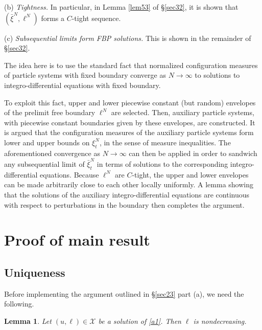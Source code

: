 \documentclass[11pt]{amsart}
\theoremstyle{plain}
\newtheorem{lemma}[theorem]{Lemma}
\newcommand{\beginsec}{
\setcounter{equation}{0}
}
\newcommand{\calX}{{\mathcal X}}
\newcommand{\iy}{\infty}
\begin{document}
(b) {\it Tightness.}
In particular, in Lemma \ref{lem53} of \S\ref{sec32}, it is shown that $(\bar\xi^N,\ell^N)$ forms a $C$-tight sequence.

(c) {\it Subsequential limits form FBP solutions.} This is shown in the remainder of \S\ref{sec32}.

The idea here is to use the standard fact that normalized configuration measures of particle systems with fixed boundary converge as $N\to\iy$ to solutions to integro-differential equations with fixed boundary.

To exploit this fact, upper and lower piecewise constant (but random) envelopes of the prelimit free boundary $\ell^N$ are selected. Then, auxiliary particle systems, with piecewise constant boundaries given by these envelopes, are constructed. It is argued that the configuration measures of the auxiliary particle systems form lower and upper bounds on $\xi^N_t$, in the sense of measure inequalities. The aforementioned convergence as $N\to\iy$ can then be applied in order to sandwich any subsequential limit of $\bar\xi^N_t$ in terms of solutions to the corresponding integro-differential equations. Because $\ell^N$ are $C$-tight, the upper and lower envelopes can be made arbitrarily close to each other locally uniformly. A lemma showing that the solutions of the auxiliary integro-differential equations are continuous with respect to perturbations in the boundary then completes the argument.



\section{Proof of main result}\label{sec3}
\beginsec

\subsection{Uniqueness}\label{sec31}

Before implementing the argument outlined in \S\ref{sec23} part (a), we need the following.

\begin{lemma}\label{lem51}
Let $(u,\ell)\in\calX$ be a solution of \eqref{a1}.
Then $\ell$ is nondecreasing.
\end{lemma}
\end{document}
